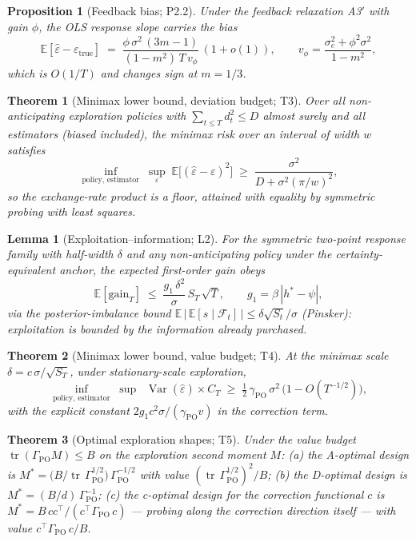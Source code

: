 \documentclass[11pt]{article}
\newtheorem{theorem}{Theorem}
\newtheorem{lemma}{Lemma}
\newtheorem{proposition}{Proposition}
\newcommand{\eps}{\varepsilon}
\newcommand{\gpo}{\gamma_{\mathrm{PO}}}
\newcommand{\Gpo}{\Gamma_{\mathrm{PO}}}
\newcommand{\hstar}{h^{*}}
\newcommand{\Var}{\operatorname{Var}}
\newcommand{\tr}{\operatorname{tr}}
\newcommand{\E}{\mathbb{E}}
\newcommand{\dev}{d}
\begin{document}
\begin{proposition}[Feedback bias; P2.2]
Under the feedback relaxation A3$'$ with gain $\phi$, the OLS response
slope carries the bias
\[
\E[\hat\eps - \eps_{\mathrm{true}}] \;=\;
\frac{\phi\,\sigma^2\,(3m-1)}{(1-m^2)\,T\,v_\phi}\,(1+o(1)),
\qquad v_\phi = \frac{\sigma_e^2 + \phi^2\sigma^2}{1-m^2},
\]
which is $O(1/T)$ and changes sign at $m = 1/3$.
\end{proposition}

\begin{theorem}[Minimax lower bound, deviation budget; T3]
Over all non-anticipating exploration policies with
$\sum_{t\le T} \dev_t^2 \le D$ almost surely and all estimators (biased
included), the minimax risk over an interval of width $w$ satisfies
\[
\inf_{\text{policy, estimator}}\;\sup_{\eps}\;
\E\big[(\hat\eps - \eps)^2\big] \;\ge\;
\frac{\sigma^2}{D + \sigma^2 (\pi/w)^2},
\]
so the exchange-rate product is a floor, attained with equality by
symmetric probing with least squares.
\end{theorem}

\begin{lemma}[Exploitation--information; L2]
For the symmetric two-point response family with half-width $\delta$ and
any non-anticipating policy under the certainty-equivalent anchor, the
expected first-order gain obeys
\[
\E[\mathrm{gain}_T] \;\le\; \frac{g_1\,\delta^2}{\sigma}\,
S_T\,\sqrt{T},
\qquad g_1 = \beta\,|\hstar - \psi|,
\]
via the posterior-imbalance bound
$\E\,\big|\,\E[s\mid\mathcal{F}_t]\,\big| \le \delta\sqrt{S_t}/\sigma$
(Pinsker): exploitation is bounded by the information already purchased.
\end{lemma}

\begin{theorem}[Minimax lower bound, value budget; T4]
At the minimax scale $\delta = c\,\sigma/\sqrt{S_T}$, under
stationary-scale exploration,
\[
\inf_{\text{policy, estimator}}\;\sup\;\;
\Var(\hat\eps)\times C_T \;\ge\; \tfrac{1}{2}\,\gpo\,\sigma^2\,
\big(1 - O(T^{-1/2})\big),
\]
with the explicit constant $2 g_1 c^2 \sigma/(\gpo v)$ in the correction
term.
\end{theorem}

\begin{theorem}[Optimal exploration shapes; T5]
Under the value budget $\tr(\Gpo M) \le B$ on the exploration second
moment $M$:
(a) the A-optimal design is $M^{*} = \big(B/\tr\,\Gpo^{1/2}\big)\,
\Gpo^{-1/2}$ with value $(\tr\,\Gpo^{1/2})^2/B$;
(b) the D-optimal design is $M^{*} = (B/d)\,\Gpo^{-1}$;
(c) the c-optimal design for the correction functional $c$ is
$M^{*} = B\,cc^\top/(c^\top \Gpo\, c)$ --- probing along the correction
direction itself --- with value $c^\top \Gpo\, c / B$.
\end{theorem}
\end{document}
